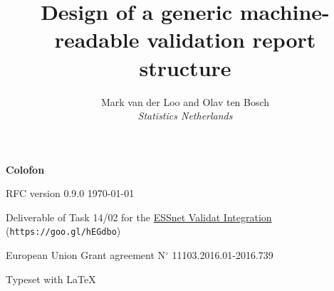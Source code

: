 \documentclass[a4paper, 11pt,titlepage]{article}
\title{Design of a generic machine-readable validation report structure}
\author{Mark van der Loo and Olav ten Bosch\\
\emph{Statistics Netherlands}
}
\date{\version{}\\
\begin{picture}(0,0)
\put(150,350){\texttt{[image: fig/logo\_validat\_integration.png]}}
\end{picture}
}
\newcommand{\version}{RFC version 0.9.0 \today}
\begin{document}
\maketitle{}

\thispagestyle{empty}
\null
\vfill{}
\begin{description}[noitemsep]
\item \textbf{Colofon}
\item \version{}
\item Deliverable of Task 14/02 for the \href{https://ec.europa.eu/eurostat/cros/content/essnet-validat-integration_en}{ESSnet Validat Integration} (\texttt{https://goo.gl/hEGdbo})
\item European Union Grant agreement N$^\circ$ 11103.2016.01-2016.739
\item Typeset with \LaTeX
\end{description}

\newpage

\tableofcontents{}

\newpage














\clearpage{}


%



\clearpage{}

\end{document}
